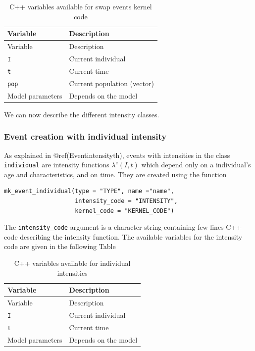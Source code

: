 \begin{longtable}[]{@{}ll@{}}
\caption{C++ variables available for swap events kernel code}\tabularnewline
\toprule()
Variable & Description \\
\midrule()
\endfirsthead
\toprule()
Variable & Description \\
\midrule()
\endhead
\texttt{I} & Current individual \\
\texttt{t} & Current time \\
\texttt{pop} & Current population (vector) \\
Model parameters & Depends on the model \\
\bottomrule()
\end{longtable}

We can now describe the different intensity classes.

\hypertarget{event-creation-with-individual-intensity}{%
\subsubsection{Event creation with individual intensity}\label{event-creation-with-individual-intensity}}

As explained in @ref(Eventintensityth), events with intensities in the class \texttt{individual} are intensity functions \(\lambda^e(I,t)\) which depend only on a individual's age and characteristics, and on time.
They are created using the function

\begin{verbatim}
mk_event_individual(type = "TYPE", name ="name",
                    intensity_code = "INTENSITY",
                    kernel_code = "KERNEL_CODE")
\end{verbatim}

The \texttt{intensity\_code} argument is a character string containing few lines C++ code describing the intensity function. The available variables for the intensity code are given in the following Table

\begin{longtable}[]{@{}ll@{}}
\caption{C++ variables available for individual intensities}\tabularnewline
\toprule()
Variable & Description \\
\midrule()
\endfirsthead
\toprule()
Variable & Description \\
\midrule()
\endhead
\texttt{I} & Current individual \\
\texttt{t} & Current time \\
Model parameters & Depends on the model \\
\bottomrule()
\end{longtable}

